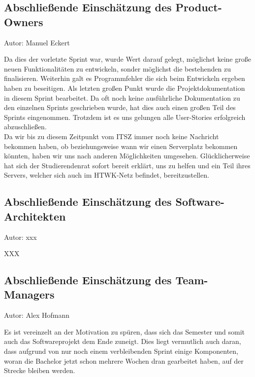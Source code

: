 \subsection{Abschließende Einschätzung des Product-Owners}
{\small Autor: Manuel Eckert}

Da dies der vorletzte Sprint war, wurde Wert darauf gelegt, möglichst keine große neuen Funktionalitäten zu entwickeln, sonder möglichst die bestehenden zu finalisieren. Weiterhin galt es Programmfehler die sich beim Entwickeln ergeben haben zu beseitigen. Als letzten großen Punkt wurde die Projektdokumentation in diesem Sprint bearbeitet. Da oft noch keine ausführliche Dokumentation zu den einzelnen Sprints geschrieben wurde, hat dies auch einen großen Teil des Sprints eingenommen. Trotzdem ist es uns gelungen alle User-Stories erfolgreich abzuschließen. \\
Da wir bis zu diesem Zeitpunkt vom ITSZ immer noch keine Nachricht bekommen haben, ob beziehungsweise wann wir einen Serverplatz bekommen könnten, haben wir uns nach anderen Möglichkeiten umgesehen. Glücklicherweise hat sich der Studierendenrat sofort bereit erklärt, uns zu helfen und ein Teil ihres Servers, welcher sich auch im HTWK-Netz befindet, bereitzustellen.

\subsection{Abschließende Einschätzung des Software-Architekten}
{\small Autor: xxx}

XXX

\subsection{Abschließende Einschätzung des Team-Managers}
{\small Autor: Alex Hofmann}

Es ist vereinzelt an der Motivation zu spüren, dass sich das Semester und somit auch das Softwareprojekt dem Ende zuneigt.
Dies liegt vermutlich auch daran, dass aufgrund von nur noch einem verbleibenden Sprint einige Komponenten, woran die Bachelor jetzt schon mehrere Wochen dran gearbeitet haben, auf der Strecke bleiben werden.
